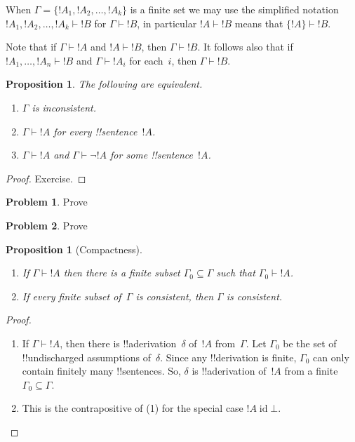 \documentclass[10pt,a4paper]{article}
\makeatletter
\theoremstyle{plain}
\newtheorem{prop}[thm]{Proposition}
\theoremstyle{definition}
\newtheorem{prob}{Problem}[section]
\theoremstyle{remark}
\newcommand*{\ollabel}[1]{\label{#1}}
\newcommand{\olref}{\@ifnextchar[{\olref@i}{\olref@final}}
\def\olref@i[#1]{\@ifnextchar[{\olref@ii}{\olref@final}}
\def\olref@ii[#1]{\@ifnextchar[{\olref@iii}{\olref@final}}
\def\olref@iii[#1]{\olref@final}
\def\olref@final#1{\ref{#1}}
\providecommand{\lfalse}{\bot}
\providecommand{\Proves}{\mathrel{\vdash}}
\providecommand{\ident}{\operatorname{id}}
\makeatother
\begin{document}
When $\Gamma = \{!A_1, !A_2, \ldots, !A_k\}$ is a finite set we may use the simplified notation $!A_1,!A_2,\ldots,!A_k \Proves !B$ for $\Gamma \Proves !B$, in particular $!A \Proves !B$ means that $\{!A\} \Proves !B$.

Note that if $\Gamma \Proves !A$ and $!A
\Proves !B$, then $\Gamma \Proves !B$. It follows also that if $!A_1,
\dots, !A_n \Proves !B$ and $\Gamma \Proves !A_i$ for each~$i$, then
$\Gamma \Proves !B$.

\begin{prop}
\ollabel{prop:incons}
The following are equivalent. 
    \begin{enumerate}
      \item \( \Gamma \) is inconsistent.
      \item \( \Gamma \Proves {!A} \) for every !!{sentence}~\( {!A} \).
      \item \( \Gamma \Proves {!A} \) and \( \Gamma \Proves \lnot {!A} \) for some !!{sentence}~\( {!A} \).
    \end{enumerate}
\end{prop}

\begin{proof}
Exercise.
\end{proof}

\begin{prob}
Prove \olref[fol][ntd][ptn]{prop:incons}
\end{prob}
\tagendprob

\begin{prob}
Prove \olref[pl][ntd][ptn]{prop:incons}
\end{prob}
\tagendprob

\begin{prop}[Compactness]
  \ollabel{prop:proves-compact}
  \begin{enumerate}
  \item If $\Gamma \Proves !A$ then there is a finite subset $\Gamma_0
    \subseteq \Gamma$ such that $\Gamma_0 \Proves !A$.
  \item If every finite subset of~$\Gamma$ is
    consistent, then $\Gamma$ is consistent.
  \end{enumerate}
\end{prop}

\begin{proof}
  \begin{enumerate}
    \item If $\Gamma \Proves !A$, then there is
      !!a{derivation}~$\delta$ of~$!A$ from~$\Gamma$. Let $\Gamma_0$
      be the set of !!{undischarged} assumptions of~$\delta$.  Since
      any !!{derivation} is finite, $\Gamma_0$ can only contain
      finitely many !!{sentence}s.  So, $\delta$ is !!a{derivation}
      of~$!A$ from a finite~$\Gamma_0 \subseteq \Gamma$.
    \item This is the contrapositive of (1) for the special case $!A
      \ident \lfalse$.
  \end{enumerate}
\end{proof}
\end{document}
